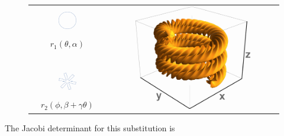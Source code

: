 \begin{figure}[htb]
\begin{tabular}{cc}
& \multirow{6}{*}{\includegraphics[width=0.7\textwidth]{../images/form_factor/supershapes/twisted_helix_super_shapes_1a.png}} \\
     \includegraphics[width=0.25\textwidth]{../images/form_factor/supershapes/twisted_helix_super_shapes_1c.png} \\
    $r_1(\theta,\alpha)$ \\ ~\\
    \includegraphics[width=0.25\textwidth]{../images/form_factor/supershapes/twisted_helix_super_shapes_1b.png}\\
    $r_2(\phi,\beta+\gamma\theta)$ \\
\end{tabular}
\end{figure}
The Jacobi determinant for this substitution is
